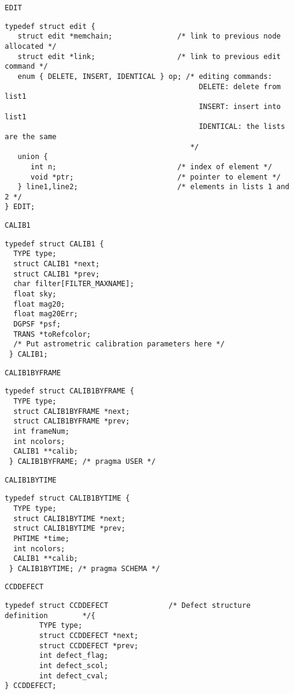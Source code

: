 {\begin{itemize}
\item[{\tt EDIT}]

\begin{verbatim}
typedef struct edit {
   struct edit *memchain;               /* link to previous node allocated */
   struct edit *link;                   /* link to previous edit command */
   enum { DELETE, INSERT, IDENTICAL } op; /* editing commands:
                                             DELETE: delete from list1
                                             INSERT: insert into list1
                                             IDENTICAL: the lists are the same
                                           */
   union {
      int n;                            /* index of element */
      void *ptr;                        /* pointer to element */
   } line1,line2;                       /* elements in lists 1 and 2 */
} EDIT;
\end{verbatim}

\item[{\tt CALIB1}]

\begin{verbatim}
typedef struct CALIB1 {
  TYPE type;
  struct CALIB1 *next;
  struct CALIB1 *prev;
  char filter[FILTER_MAXNAME];
  float sky;
  float mag20;
  float mag20Err;
  DGPSF *psf;
  TRANS *toRefcolor;
  /* Put astrometric calibration parameters here */
 } CALIB1;
\end{verbatim}

\item[{\tt CALIB1BYFRAME}]

\begin{verbatim}
typedef struct CALIB1BYFRAME {
  TYPE type;
  struct CALIB1BYFRAME *next;
  struct CALIB1BYFRAME *prev;
  int frameNum;
  int ncolors;
  CALIB1 **calib;
 } CALIB1BYFRAME; /* pragma USER */
\end{verbatim}

\item[{\tt CALIB1BYTIME}]

\begin{verbatim}
typedef struct CALIB1BYTIME {
  TYPE type;
  struct CALIB1BYTIME *next;
  struct CALIB1BYTIME *prev;
  PHTIME *time;
  int ncolors;
  CALIB1 **calib;
 } CALIB1BYTIME; /* pragma SCHEMA */
\end{verbatim}

\item[{\tt CCDDEFECT}]

\begin{verbatim}
typedef struct CCDDEFECT              /* Defect structure definition        */{
        TYPE type;
        struct CCDDEFECT *next;
        struct CCDDEFECT *prev;
        int defect_flag;
        int defect_scol;
        int defect_cval;
} CCDDEFECT;
\end{verbatim}


\end{itemize}}
